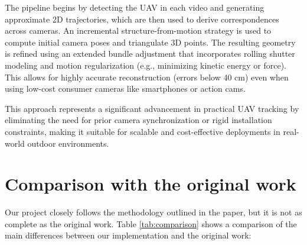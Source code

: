 \documentclass[11pt]{article}
\begin{document}
The pipeline begins by detecting the UAV in each video and generating approximate 2D trajectories, which are then used to derive correspondences across cameras. An incremental structure-from-motion strategy is used to compute initial camera poses and triangulate 3D points. The resulting geometry is refined using an extended bundle adjustment that incorporates rolling shutter modeling and motion regularization (e.g., minimizing kinetic energy or force). This allows for highly accurate reconstruction (errors below 40 cm) even when using low-cost consumer cameras like smartphones or action cams.

This approach represents a significant advancement in practical UAV tracking by eliminating the need for prior camera synchronization or rigid installation constraints, making it suitable for scalable and cost-effective deployments in real-world outdoor environments.

\section{Comparison with the original work}

Our project closely follows the methodology outlined in the paper, but it is not as complete as the original work. Table \ref{tab:comparison} shows a comparison of the main differences between our implementation and the original work:
\end{document}
